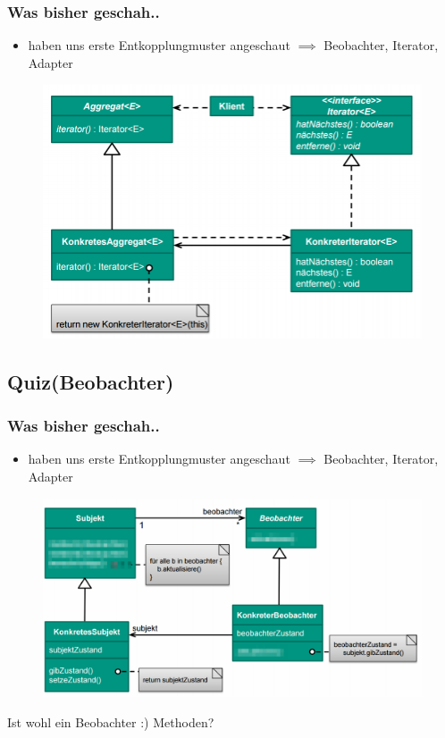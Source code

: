 \documentclass[18pt]{beamer}
\begin{document}
	\begin{frame}
		\frametitle{Was bisher geschah..}
		\begin{itemize}
			\item haben uns erste Entkopplungmuster angeschaut
			\linebreak $\implies$ Beobachter, Iterator, Adapter
		\end{itemize}
		\begin{figure}
			\includegraphics[scale=0.35]{./pics/tut3/iter.png}
		\end{figure}
	\end{frame}
	
	\subsection{Quiz(Beobachter)}
	
	\begin{frame}
		\frametitle{Was bisher geschah..}
		\begin{itemize}
			\item haben uns erste Entkopplungmuster angeschaut
			\linebreak $\implies$ Beobachter, Iterator, Adapter
		\end{itemize}
		\begin{figure}
			\includegraphics[scale=0.25]{./pics/tut4/obs-mod.png}
		\end{figure}
		\pause Ist wohl ein Beobachter :) \pause Methoden?
	\end{frame}
	
\end{document}
